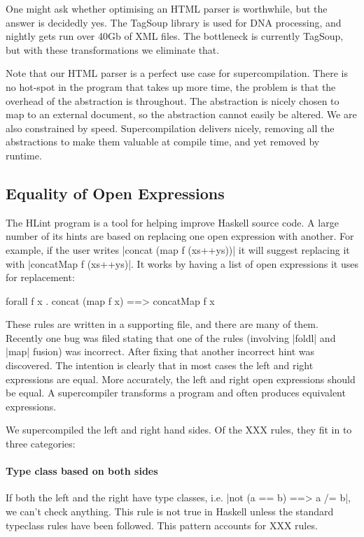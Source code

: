 \documentclass[draft]{sigplanconf}
\newcommand{\unknown}{XXX}
\begin{document}
One might ask whether optimising an HTML parser is worthwhile, but the answer is decidedly yes. The TagSoup library is used for DNA processing, and nightly gets run over 40Gb of XML files. The bottleneck is currently TagSoup, but with these transformations we eliminate that.

Note that our HTML parser is a perfect use case for supercompilation. There is no hot-spot in the program that takes up more time, the problem is that the overhead of the abstraction is throughout. The abstraction is nicely chosen to map to an external document, so the abstraction cannot easily be altered. We are also constrained by speed. Supercompilation delivers nicely, removing all the abstractions to make them valuable at compile time, and yet removed by runtime.

\subsection{Equality of Open Expressions}
\label{sec:hlint}

The HLint program \cite{hlint} is a tool for helping improve Haskell source code. A large number of its hints are based on replacing one open expression with another. For example, if the user writes |concat (map f (xs++ys))| it will suggest replacing it with |concatMap f (xs++ys)|. It works by having a list of open expressions it uses for replacement:

\begin{code}
forall f x . concat (map f x) ==> concatMap f x
\end{code}

These rules are written in a supporting file, and there are many of them. Recently one bug was filed stating that one of the rules (involving |foldl| and |map| fusion) was incorrect. After fixing that another incorrect hint was discovered. The intention is clearly that in most cases the left and right expressions are equal. More accurately, the left and right open expressions should be equal. A supercompiler transforms a program and often produces equivalent expressions.

We supercompiled the left and right hand sides. Of the \unknown{} rules, they fit in to three categories:

\paragraph{Type class based on both sides}

If both the left and the right have type classes, i.e. |not (a == b) ==> a /= b|, we can't check anything. This rule is not true in Haskell unless the standard typeclass rules have been followed. This pattern accounts for \unknown{} rules.
\end{document}
